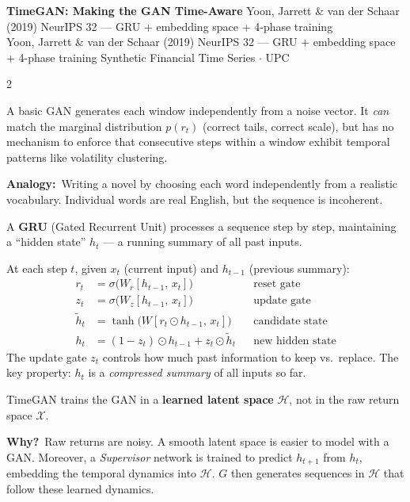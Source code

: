 \documentclass[10pt]{article}
\newcommand{\navybox}[2]{\begin{tcolorbox}[mybox={Navy}{LBg},title={#1}]#2\end{tcolorbox}}
\newcommand{\skybox}[2]{\begin{tcolorbox}[mybox={Sky}{BBg},title={#1}]#2\end{tcolorbox}}
\newcommand{\pagehead}[2]{%
  \begin{tcolorbox}[enhanced,arc=0pt,outer arc=0pt,boxrule=0pt,
    colback=Navy,colframe=Navy,
    top=5pt,bottom=5pt,left=8pt,right=8pt,
    before skip=0pt,after skip=10pt]
  {\color{white}\large\bfseries #1}%
  \ifx\relax#2\relax\else\\[1pt]{\color{blue!30!white}\small #2}\fi
  \hfill{\color{blue!20!white}\footnotesize Synthetic Financial Time Series $\cdot$ UPC}
  \end{tcolorbox}}
\begin{document}
\clearpage

\pagehead{TimeGAN: Making the GAN Time-Aware}
         {Yoon, Jarrett \& van der Schaar (2019) NeurIPS 32 --- GRU + embedding space + 4-phase training}

\begin{multicols}{2}

\navybox{Why a Plain GAN Fails on Time Series}{%
A basic GAN generates each window independently from a noise vector. It \emph{can} match the marginal distribution $p(r_t)$ (correct tails, correct scale), but has no mechanism to enforce that consecutive steps within a window exhibit temporal patterns like volatility clustering.

\textbf{Analogy:}\ Writing a novel by choosing each word independently from a realistic vocabulary. Individual words are real English, but the sequence is incoherent.}

\skybox{What is a GRU? (From Scratch)}{%
A \textbf{GRU} (Gated Recurrent Unit) processes a sequence step by step, maintaining a ``hidden state'' $h_t$ --- a running summary of all past inputs.

At each step $t$, given $x_t$ (current input) and $h_{t-1}$ (previous summary):
\begin{align*}
  r_t &= \sigma\!\bigl(W_r [h_{t-1},\, x_t]\bigr) && \text{reset gate} \\
  z_t &= \sigma\!\bigl(W_z [h_{t-1},\, x_t]\bigr) && \text{update gate} \\
  \tilde{h}_t &= \tanh\!\bigl(W [r_t \odot h_{t-1},\, x_t]\bigr) && \text{candidate state} \\
  h_t &= (1-z_t)\odot h_{t-1} + z_t \odot \tilde{h}_t && \text{new hidden state}
\end{align*}
The update gate $z_t$ controls how much past information to keep vs.\ replace. The key property: $h_t$ is a \emph{compressed summary} of all inputs so far.}

\navybox{Key Innovation: Generating in Embedding Space}{%
TimeGAN trains the GAN in a \textbf{learned latent space} $\mathcal{H}$, not in the raw return space $\mathcal{X}$.

\textbf{Why?}\ Raw returns are noisy. A smooth latent space is easier to model with a GAN. Moreover, a \emph{Supervisor} network is trained to predict $h_{t+1}$ from $h_t$, embedding the temporal dynamics into $\mathcal{H}$. $G$ then generates sequences in $\mathcal{H}$ that follow these learned dynamics.}


\end{multicols}
\end{document}
